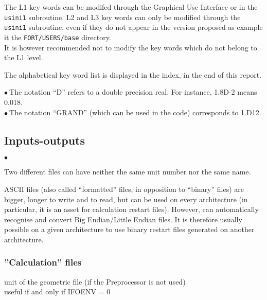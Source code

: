 The L1 key words can be modifed through the Graphical Use Interface or
in the \texttt{usini1} subroutine. L2 and L3 key words can only be modified through
the \texttt{usini1} subroutine, even if they do not appear in the version proposed
as example it the \texttt{FORT/USERS/base} directory.\\
It is however recommended not to modify the key words which do not belong to the L1
level.

The alphabetical key word list is displayed in the index, in the end of
this report.

$\bullet\ $The notation ``D'' refers to a double precision real. For
           instance, 1.8D-2 means 0.018. \\
$\bullet\ $The notation ``GRAND'' (which can be used in the code)
corresponds to 1.D12.

\subsection{Inputs-outputs}

\begin{list}{$\bullet$}{}
\item Two different files can have neither the same unit number nor the
      same name.
\item  ASCII files (also called ``formatted'' files, in opposition to
      ``binary'' files) are bigger, longer to write and to read, but can
      be used on every architecture (in particular, it is an asset for
      calculation restart files). However, \CS can automatically recognise and
      convert Big Endian/Little Endian files. It is therefore usually possible on
      a given architecture to use binary restart files generated on another
      architecture.
 \end{list}

\subsubsection{''Calculation'' files}



{unit of the geometric file (if the Preprocessor is not used)\\
useful if and only if IFOENV = 0}

